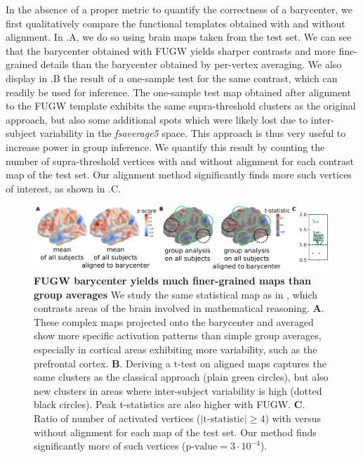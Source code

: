 In the absence of a proper metric to quantify the correctness of a barycenter,
we first qualitatively compare the functional templates obtained with and without alignment.
In .A, we do so using brain maps taken from the test set.
We can see that the barycenter obtained with FUGW yields sharper contrasts and
more fine-grained details than the barycenter obtained by per-vertex averaging.
We also display in .B
the result of a one-sample test for the same contrast, which can readily be used for inference.
The one-sample test map obtained after alignment to the FUGW template exhibits
the same supra-threshold clusters as the original approach, but also some additional spots
which were likely lost due to inter-subject variability in the \emph{fsaverage5} space.
This approach is thus very useful to increase power in group inference.
We quantify this result by counting the number of supra-threshold vertices
with and without alignment for each contrast map of the test set.
Our alignment method significantly finds more such vertices of interest,
as shown in .C.
\begin{figure}[t]
    \centering
    \includegraphics[width=1\columnwidth]{./Chapitre4/figures/barycenter_group_analysis.pdf}
    \caption{
        \textbf{FUGW barycenter yields much finer-grained maps than group averages}
        We study the same statistical map as in , which contrasts
        areas of the brain involved in mathematical reasoning.
        \textbf{A}. These complex maps projected onto the barycenter and averaged
        show more specific activation patterns than simple group averages,
        especially in cortical areas exhibiting more variability, such as the prefrontal cortex.
        \textbf{B}. Deriving a t-test on aligned maps captures the same clusters
        as the classical approach (plain green circles), but also new clusters in areas
        where inter-subject variability is high (dotted black circles).
        Peak t-statistics are also higher with FUGW.
        \textbf{C}. Ratio of number of activated vertices ($|\text{t-statistic}| \geq 4$)
        with versus without alignment for each map of the test set.
        Our method finds significantly more of such vertices ($\text{p-value} = 3\cdot10^{-4}$).}
    \label{fig:barycenter_vs_group_average}
\end{figure}

